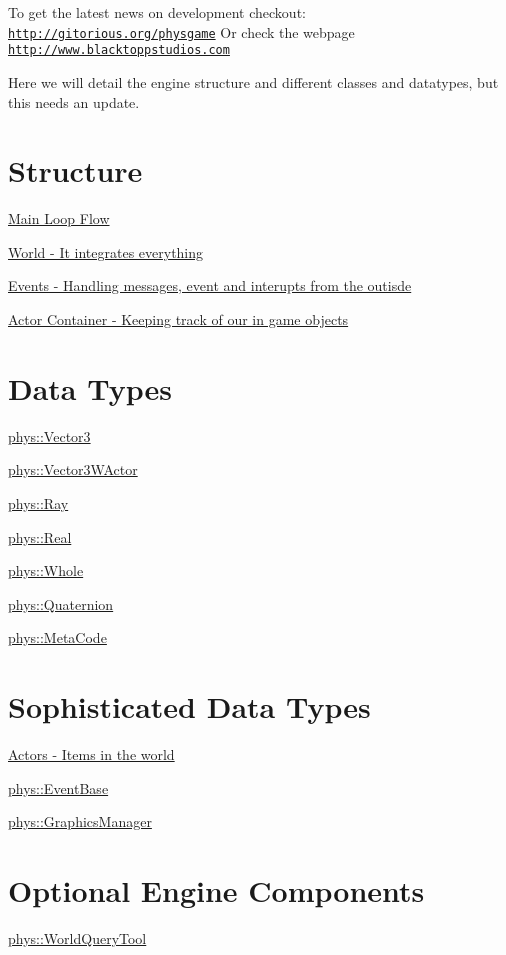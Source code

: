 To get the latest news on development checkout: \href{http://gitorious.org/physgame}{\tt http://gitorious.org/physgame} Or check the webpage \href{http://www.blacktoppstudios.com}{\tt http://www.blacktoppstudios.com}

Here we will detail the engine structure and different classes and datatypes, but this needs an update.\hypertarget{index_Engine}{}\section{Structure}\label{index_Engine}
\hyperlink{mainloop1}{Main Loop Flow}

\hyperlink{classphys_1_1World}{World -\/ It integrates everything}

\hyperlink{classphys_1_1EventManager}{Events -\/ Handling messages, event and interupts from the outisde}

\hyperlink{actorcontainer1}{Actor Container -\/ Keeping track of our in game objects}\hypertarget{index_Types}{}\section{Data Types}\label{index_Types}
\hyperlink{classphys_1_1Vector3}{phys::Vector3}

\hyperlink{classphys_1_1Vector3WActor}{phys::Vector3WActor}

\hyperlink{classphys_1_1Ray}{phys::Ray}

\hyperlink{namespacephys_af7eb897198d265b8e868f45240230d5f}{phys::Real}

\hyperlink{namespacephys_a460f6bc24c8dd347b05e0366ae34f34a}{phys::Whole}

\hyperlink{classphys_1_1Quaternion}{phys::Quaternion}

\hyperlink{classphys_1_1MetaCode}{phys::MetaCode}\hypertarget{index_Classes}{}\section{Sophisticated Data Types}\label{index_Classes}
\hyperlink{classphys_1_1ActorBase}{Actors -\/ Items in the world}

\hyperlink{classphys_1_1EventBase}{phys::EventBase}

\hyperlink{classphys_1_1GraphicsManager}{phys::GraphicsManager}\hypertarget{index_Optional}{}\section{Optional Engine Components}\label{index_Optional}
\hyperlink{classphys_1_1WorldQueryTool}{phys::WorldQueryTool} 